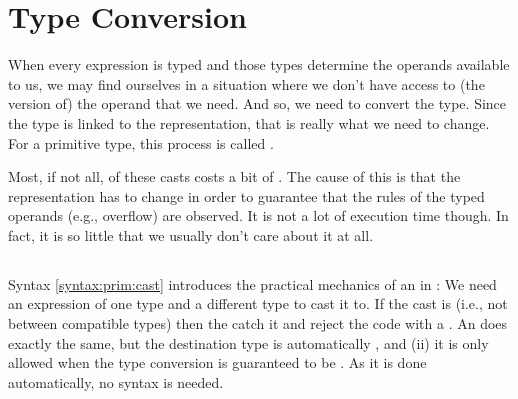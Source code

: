

\section{Type Conversion}

When every expression is typed and those types determine the operands available to us, we may find ourselves in a situation where we don't have access to (the version of) the operand that we need. And so, we need to convert the type. Since the type is linked to the representation, that is really what we need to change. For a primitive type, this process is called .

Most, if not all, of these casts costs a bit of . The cause of this is that the representation has to change in order to guarantee that the rules of the typed operands (e.g., overflow) are observed. It is not a lot of execution time though. In fact, it is so little that we usually don't care about it at all.

\subsection{\csharp}

Syntax \ref{syntax:prim:cast} introduces the practical mechanics of an  in \csharp: We need an expression of one type and a different type to cast it to. If the cast is  (i.e., not between compatible types) then the  catch it and reject the code with a . An  does exactly the same, but the destination type is automatically , and (ii) it is only allowed when the type conversion is guaranteed to be . As it is done automatically, no syntax is needed.

